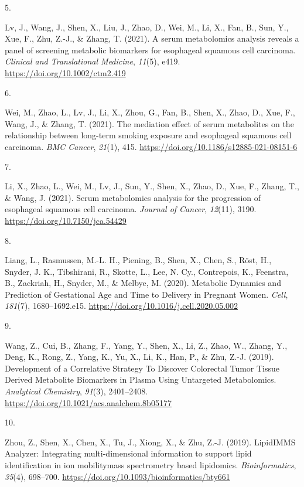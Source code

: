 \documentclass[11pt,a4paper,]{moderncv}
\newlength{\csllabelwidth}
\newcommand{\CSLLeftMargin}[1]{\parbox[t]{\csllabelwidth}{#1}}
\newcommand{\CSLRightInline}[1]{\parbox[t]{\linewidth - \csllabelwidth}{#1}}
\begin{document}
\leavevmode{}%
\CSLLeftMargin{5. }%
\CSLRightInline{Lv, J., Wang, J., Shen, X., Liu, J., Zhao, D., Wei, M.,
Li, X., Fan, B., Sun, Y., Xue, F., Zhu, Z.-J., \& Zhang, T. (2021). A
serum metabolomics analysis reveals a panel of screening metabolic
biomarkers for esophageal squamous cell carcinoma. \emph{Clinical and
Translational Medicine}, \emph{11}(5), e419.
\url{https://doi.org/10.1002/ctm2.419}}

\leavevmode{}%
\CSLLeftMargin{6. }%
\CSLRightInline{Wei, M., Zhao, L., Lv, J., Li, X., Zhou, G., Fan, B.,
Shen, X., Zhao, D., Xue, F., Wang, J., \& Zhang, T. (2021). The
mediation effect of serum metabolites on the relationship between
long-term smoking exposure and esophageal squamous cell carcinoma.
\emph{BMC Cancer}, \emph{21}(1), 415.
\url{https://doi.org/10.1186/s12885-021-08151-6}}

\leavevmode{}%
\CSLLeftMargin{7. }%
\CSLRightInline{Li, X., Zhao, L., Wei, M., Lv, J., Sun, Y., Shen, X.,
Zhao, D., Xue, F., Zhang, T., \& Wang, J. (2021). Serum metabolomics
analysis for the progression of esophageal squamous cell carcinoma.
\emph{Journal of Cancer}, \emph{12}(11), 3190.
\url{https://doi.org/10.7150/jca.54429}}

\leavevmode{}%
\CSLLeftMargin{8. }%
\CSLRightInline{Liang, L., Rasmussen, M.-L. H., Piening, B., Shen, X.,
Chen, S., Röst, H., Snyder, J. K., Tibshirani, R., Skotte, L., Lee, N.
Cy., Contrepois, K., Feenstra, B., Zackriah, H., Snyder, M., \& Melbye,
M. (2020). Metabolic Dynamics and Prediction of Gestational Age and Time
to Delivery in Pregnant Women. \emph{Cell}, \emph{181}(7),
1680--1692.e15. \url{https://doi.org/10.1016/j.cell.2020.05.002}}

\leavevmode{}%
\CSLLeftMargin{9. }%
\CSLRightInline{Wang, Z., Cui, B., Zhang, F., Yang, Y., Shen, X., Li,
Z., Zhao, W., Zhang, Y., Deng, K., Rong, Z., Yang, K., Yu, X., Li, K.,
Han, P., \& Zhu, Z.-J. (2019). Development of a Correlative Strategy To
Discover Colorectal Tumor Tissue Derived Metabolite Biomarkers in Plasma
Using Untargeted Metabolomics. \emph{Analytical Chemistry},
\emph{91}(3), 2401--2408.
\url{https://doi.org/10.1021/acs.analchem.8b05177}}

\leavevmode{}%
\CSLLeftMargin{10. }%
\CSLRightInline{Zhou, Z., Shen, X., Chen, X., Tu, J., Xiong, X., \& Zhu,
Z.-J. (2019). LipidIMMS Analyzer: Integrating multi-dimensional
information to support lipid identification in ion mobilitymass
spectrometry based lipidomics. \emph{Bioinformatics}, \emph{35}(4),
698--700. \url{https://doi.org/10.1093/bioinformatics/bty661}}
\end{document}
